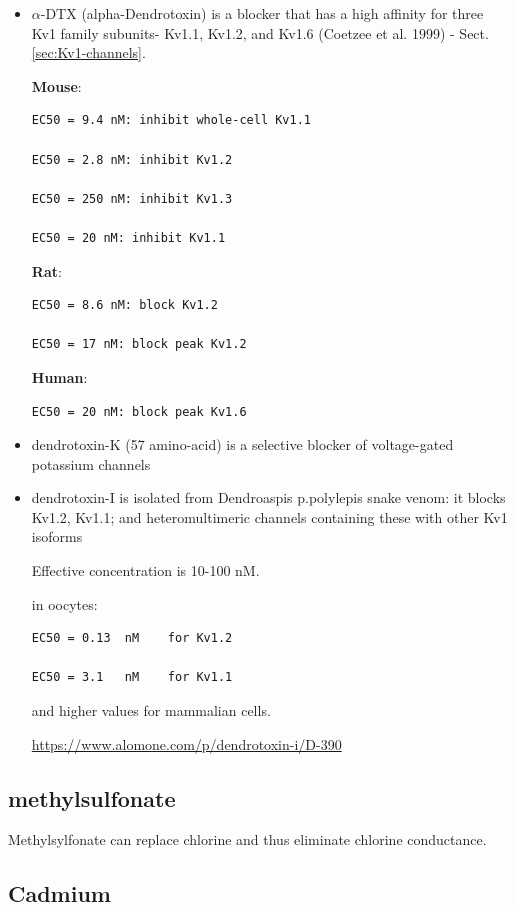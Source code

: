 \begin{itemize}
  \item  $\alpha$-DTX (alpha-Dendrotoxin) is a blocker that has a high affinity
  for three Kv1 family subunits- Kv1.1, Kv1.2, and Kv1.6 (Coetzee et al. 1999) -
Sect.\ref{sec:Kv1-channels}.

{\bf Mouse}:
\begin{verbatim}
EC50 = 9.4 nM: inhibit whole-cell Kv1.1

EC50 = 2.8 nM: inhibit Kv1.2

EC50 = 250 nM: inhibit Kv1.3 

EC50 = 20 nM: inhibit Kv1.1
\end{verbatim}

{\bf Rat}:
\begin{verbatim}
EC50 = 8.6 nM: block Kv1.2

EC50 = 17 nM: block peak Kv1.2
\end{verbatim}

{\bf Human}:
\begin{verbatim}
EC50 = 20 nM: block peak Kv1.6 
\end{verbatim}

  \item dendrotoxin-K (57 amino-acid) is a  selective blocker of voltage-gated
  potassium channels
  
  \item dendrotoxin-I is  isolated from Dendroaspis p.polylepis snake venom: it
  blocks Kv1.2, Kv1.1; and  heteromultimeric channels containing
  these with other Kv1 isoforms
  
Effective concentration is 10-100 nM.  

in oocytes:
\begin{verbatim}
EC50 = 0.13  nM    for Kv1.2

EC50 = 3.1   nM    for Kv1.1
\end{verbatim}
and higher values for mammalian cells.

\url{https://www.alomone.com/p/dendrotoxin-i/D-390}

\end{itemize}


\subsection{methylsulfonate}
\label{sec:methylsulfonate}

Methylsylfonate can replace chlorine and thus eliminate chlorine conductance.

\subsection{Cadmium}
\label{sec:cadmium}

